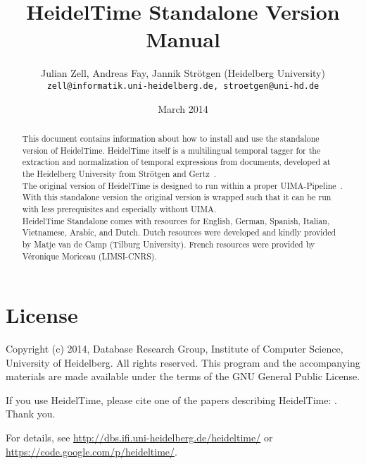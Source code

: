 \documentclass[
     11pt,         %
     a4paper,      %
     oneside,
     ]{article}
\newcommand{\languages}{English, German, Spanish, Italian, Vietnamese, Arabic, and Dutch}
\begin{document}
\title{%
HeidelTime Standalone Version\\
Manual
}
\author{Julian Zell, Andreas Fay, Jannik Str\"otgen (Heidelberg University)\\[0.2em]
\small \texttt{zell@informatik.uni-heidelberg.de, stroetgen@uni-hd.de}
}
\date{March 2014}
\maketitle

\begin{abstract}
This document contains information about how to install and use the standalone version of HeidelTime. HeidelTime itself is a multilingual temporal tagger for the extraction and normalization of temporal expressions from documents, developed at the Heidelberg University from Str\"otgen and Gertz~\cite{Strotgen2010, HeidelTime, StroetgenGertz2012}.\\
The original version of HeidelTime is designed to run within a proper UIMA-Pipeline~\cite{UIMA}. With this standalone version the original version is wrapped such that it can be run with less prerequisites and especially without UIMA.\\
HeidelTime Standalone comes with resources for \languages. Dutch resources were developed and kindly provided by Matje van de Camp (Tilburg University)\cite{Matje}. French resources were provided by Véronique Moriceau (LIMSI-CNRS)\cite{Veronique}.
\end{abstract}

\tableofcontents






\section{License}
Copyright (c) 2014, Database Research Group, Institute of Computer Science, University of Heidelberg. 
All rights reserved. This program and the accompanying materials 
are made available under the terms of the GNU General Public License.

If you use HeidelTime, please cite one of the papers describing HeidelTime: \cite{Strotgen2010, StroetgenGertz2012}. Thank you.

For details, see \url{http://dbs.ifi.uni-heidelberg.de/heideltime/} or \\
\url{https://code.google.com/p/heideltime/}.







\end{document}
